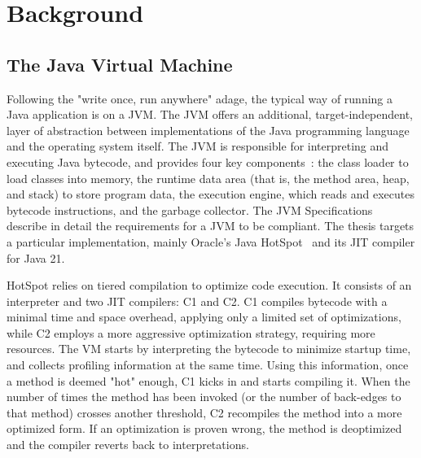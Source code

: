 \chapter{Background}


\section{The Java Virtual Machine}
Following the "write once, run anywhere" adage, the typical way of running a Java application is on a JVM.
The JVM offers an additional, target-independent, layer of abstraction between implementations of the Java programming language and the operating system itself.
The JVM is responsible for interpreting and executing Java bytecode, and provides four key components~\cite{dannarapu_jvm_2023-1}: 
the class loader to load classes into memory, the runtime data area (that is, the method area, heap, and stack) to store program data, the execution engine, which reads and executes bytecode instructions, and the garbage collector. The JVM Specifications~\cite{noauthor_java_nodate-1} describe in detail the requirements for a JVM to be compliant. 
The thesis targets a particular implementation, mainly Oracle's Java HotSpot~\cite{noauthor_hotspot_nodate} and its JIT compiler for Java 21. 

HotSpot relies on tiered compilation to optimize code execution. It consists of an interpreter and two JIT compilers: C1 and C2. 
C1 compiles bytecode with a minimal time and space overhead, applying only a limited set of optimizations, while C2 employs a more aggressive optimization strategy, requiring more resources.
The VM starts by interpreting the bytecode to minimize startup time, and collects profiling information at the same time. Using this information, once a method is deemed "hot" enough, C1 kicks in and starts compiling it. When the number of times the method has been invoked (or the number of back-edges to that method) crosses another threshold, C2 recompiles the method into a more optimized form. If an optimization is proven wrong, the method is deoptimized and the compiler reverts back to interpretations.  

